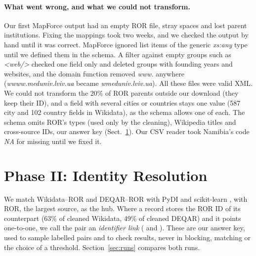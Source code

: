 \documentclass[runningheads,a4paper]{llncs}
\begin{document}
\paragraph{What went wrong, and what we could not transform.} Our first MapForce output had an empty ROR
file, stray spaces and lost parent institutions. Fixing the mappings took two weeks,
and we checked the output by hand until it was correct. MapForce ignored list
items of the generic \emph{xs:any} type until we defined them in the schema. A filter against empty groups
such as \emph{<web/>} checked one field only and deleted groups with founding years and websites,
and the domain function removed \emph{www.} anywhere (\emph{wwww.meduniv.lviv.ua} became
\emph{wmeduniv.lviv.ua}). All these files were valid XML. We could not transform the 20\% of ROR
parents outside our download (they keep their ID), and a field with several cities or
countries stays one value (587 city and 102 country fields in Wikidata), as the schema
allows one of each. The schema omits ROR's types (used only by the cleaning), Wikipedia titles and
cross-source IDs, our answer key (Sect.~\ref{sec:phase2}). Our CSV reader took Namibia's code \emph{NA}
for missing until we fixed it.

\section{Phase II: Identity Resolution}\label{sec:phase2}

We match Wikidata--ROR and DEQAR--ROR with PyDI \cite{pydi2026} and scikit-learn \cite{pedregosa2011sklearn},
with ROR, the largest source, as the hub. Where a record stores the ROR ID of its counterpart (63\% of
cleaned Wikidata, 49\% of cleaned DEQAR) and it points one-to-one, we call the pair an \emph{identifier
link} (\wrIdLinks{} and \drIdLinks{}). These are our answer key, used to sample labelled pairs and to
check results, never in blocking, matching or the choice of a threshold. Section~\ref{sec:runs} compares
both runs.
\end{document}
